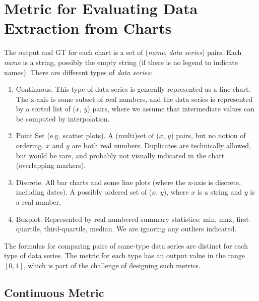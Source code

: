 \documentclass[a4paper,11pt]{scrartcl}
\begin{document}
\section{Metric for Evaluating Data Extraction from Charts}

The output and GT for each chart is a set of (\emph{name}, \emph{data series}) pairs.
Each \emph{name} is a string, possibly the empty string (if there is no legend to indicate names).
There are different types of \emph{data series}:
\begin{enumerate}
\item Continuous.  This type of data series is generally represented as a line chart.  The x-axis is some subset of real numbers, and the data series is represented by a sorted list of ($x$, $y$) pairs, where we assume that intermediate values can be computed by interpolation.
\item Point Set (e.g. scatter plots).  A (multi)set of ($x$, $y$) pairs, but no notion of ordering.  $x$ and $y$ are both real numbers.  Duplicates are technically allowed, but would be rare, and probably not visually indicated in the chart (overlapping markers).
\item Discrete.  All bar charts and some line plots (where the x-axis is discrete, including dates).  A possibly ordered set of ($x$, $y$), where $x$ is a string and $y$ is a real number.
\item Boxplot.  Represented by real numbered summary statistics: min, max, first-quartile, third-quartile, median.  We are ignoring any outliers indicated.
\end{enumerate}
The formulas for comparing pairs of same-type data series are distinct for each type of data series.
The metric for each type has an output value in the range $[0,1]$, which is part of the challenge of designing such metrics.

\subsection{Continuous Metric}
\end{document}
